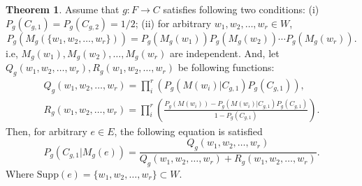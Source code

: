 \documentclass[11pt, a4note]{article}
\theoremstyle{definition}
\newtheorem{theorem}{Theorem}[section]
\begin{document}
\begin{theorem}
Assume that $ g : F \to C $ satisfies following two conditions:
(i) $ P_{g}(C_{g,1}) = P_{g}(C_{g,2}) = 1/2 $;
(ii) for arbitrary $ w_{1}, w_{2}, \dots, w_{r} \in W $,
\begin{equation}
P_{g}(M_{g}(\{ w_{1}, w_{2}, \dots, w_{r} \})) = P_{g}(M_{g}(w_{1}))P_{g}(M_{g}(w_{2})) \cdots P_{g}(M_{g}(w_{r})).
\end{equation}
i.e, $ M_{g}(w_{1}), M_{g}(w_{2}), \dots, M_{g}(w_{r}) $ are independent.
And, let $ Q_{g}(w_{1}, w_{2}, \dots, w_{r}), R_{g}(w_{1}, w_{2}, \dots, w_{r}) $ be following functions:
\begin{eqnarray}
Q_{g}(w_{1}, w_{2}, \dots, w_{r}) = \prod_{i}^{r}(P_{g}(M(w_{i})|C_{g,1})P_{g}(C_{g,1})), \\
R_{g}(w_{1}, w_{2}, \dots, w_{r}) = \prod_{i}^{r}(\frac{P_{g}(M(w_{i})) - P_{g}(M(w_{i})|C_{g,1})P_{g}(C_{g,1})}{1 - P_{g}(C_{g,1})}).
\end{eqnarray}
Then, for arbitrary $ e \in E $, the following equation is satisfied
\begin{equation}
P_{g}(C_{g,1}|M_{g}(e))
= \frac{Q_{g}(w_{1}, w_{2}, \dots, w_{r})}{Q_{g}(w_{1}, w_{2}, \dots, w_{r}) + R_{g}(w_{1}, w_{2}, \dots, w_{r})}.
\end{equation}
Where $ \mathrm{Supp}(e) = \{ w_{1}, w_{2}, \dots, w_{r} \} \subset W $.
\end{theorem}

\end{document}
